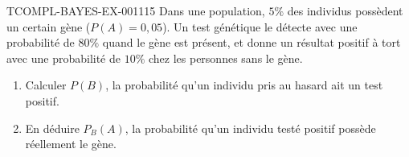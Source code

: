\begin{exercice}{TCOMPL-BAYES-EX-001}{1}{15}
Dans une population, $5\%$ des individus possèdent un certain gène ($P(A)=0{,}05$). Un test génétique le détecte avec une probabilité de $80\%$ quand le gène est présent, et donne un résultat positif à tort avec une probabilité de $10\%$ chez les personnes sans le gène.
\begin{enumerate}
  \item Calculer $P(B)$, la probabilité qu'un individu pris au hasard ait un test positif.
  \item En déduire $P_B(A)$, la probabilité qu'un individu testé positif possède réellement le gène.
\end{enumerate}
\end{exercice}
